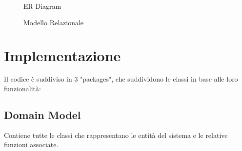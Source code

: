 \documentclass{article}
\begin{document}
\begin{figure}[H]
    \centering
    \caption{ER Diagram}
    \label{fig:diagram_er}
\end{figure}

\begin{figure}[H]
    \centering
    \caption{Modello Relazionale}
    \label{fig:diagram_modellorelazionale}
\end{figure}

\section{Implementazione}
Il codice è suddiviso in 3 "packages", che suddividono le classi in base alle loro funzionalità:

\subsection{Domain Model}
Contiene tutte le classi che rappresentano le entità del sistema e le relative funzioni associate.
\end{document}
